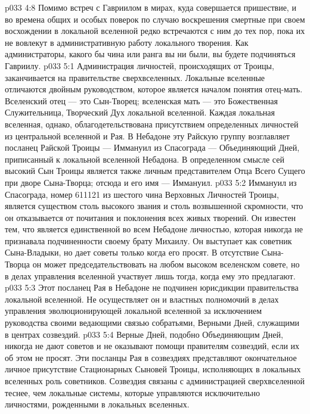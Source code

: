 \vs p033 4:8 Помимо встреч с Гавриилом в мирах, куда совершается пришествие, и во времена общих и особых поверок по случаю воскрешения смертные при своем восхождении в локальной вселенной редко встречаются с ним до тех пор, пока их не вовлекут в административную работу локального творения. Как администраторы, какого бы чина или ранга вы ни были, вы будете подчиняться Гавриилу.
\vs p033 5:1 Администрация личностей, происходящих от Троицы, заканчивается на правительстве сверхвселенных. Локальные вселенные отличаются двойным руководством, которое является началом понятия отец\hyp{}мать. Вселенский отец --- это Сын\hyp{}Творец; вселенская мать --- это Божественная Служительница, Творческий Дух локальной вселенной. Каждая локальная вселенная, однако, облагодетельствована присутствием определенных личностей из центральной вселенной и Рая. В Небадоне эту Райскую группу возглавляет посланец Райской Троицы --- Иммануил из Спасограда --- Объединяющий Дней, приписанный к локальной вселенной Небадона. В определенном смысле сей высокий Сын Троицы является также личным представителем Отца Всего Сущего при дворе Сына\hyp{}Творца; отсюда и его имя --- Иммануил.
\vs p033 5:2 Иммануил из Спасограда, номер 611121 из шестого чина Верховных Личностей Троицы, является существом столь высокого звания и столь возвышенной скромности, что он отказывается от почитания и поклонения всех живых творений. Он известен тем, что является единственной во всем Небадоне личностью, которая никогда не признавала подчиненности своему брату Михаилу. Он выступает как советник Сына\hyp{}Владыки, но дает советы только когда его просят. В отсутствие Сына\hyp{}Творца он может председательствовать на любом высоком вселенском совете, но в делах управления вселенной участвует лишь тогда, когда ему это предлагают.
\vs p033 5:3 Этот посланец Рая в Небадоне не подчинен юрисдикции правительства локальной вселенной. Не осуществляет он и властных полномочий в делах управления эволюционирующей локальной вселенной за исключением руководства своими ведающими связью собратьями, Верными Дней, служащими в центрах созвездий.
\vs p033 5:4 Верные Дней, подобно Объединяющим Дней, никогда не дают советов и не оказывают помощи правителям созвездий, если их об этом не просят. Эти посланцы Рая в созвездиях представляют окончательное личное присутствие Стационарных Сыновей Троицы, исполняющих в локальных вселенных роль советников. Созвездия связаны с администрацией сверхвселенной теснее, чем локальные системы, которые управляются исключительно личностями, рожденными в локальных вселенных.
